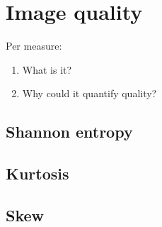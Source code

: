 
\section{Image quality}\label{subsec:imq}
Per measure:
\begin{enumerate}
    \item What is it?
    \item Why could it quantify quality?
\end{enumerate}

\subsection{Shannon entropy}

\subsection{Kurtosis}

\subsection{Skew}